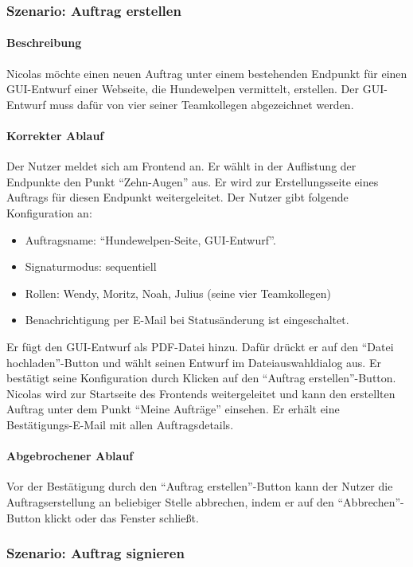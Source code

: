 \subsubsection{Szenario: Auftrag erstellen}
\paragraph{Beschreibung}
Nicolas möchte einen neuen Auftrag unter einem bestehenden Endpunkt für einen GUI-Entwurf einer Webseite, die Hundewelpen vermittelt, erstellen. Der GUI-Entwurf muss dafür von vier seiner Teamkollegen abgezeichnet werden.
\paragraph{Korrekter Ablauf}
Der Nutzer meldet sich am \gls{Frontend} an. Er wählt in der Auflistung der Endpunkte den Punkt \enquote{Zehn-Augen} aus. Er wird zur Erstellungsseite eines Auftrags für diesen Endpunkt weitergeleitet. Der Nutzer gibt folgende Konfiguration an:
\begin{itemize}
	\item Auftragsname: \enquote{Hundewelpen-Seite, GUI-Entwurf}.
	\item Signaturmodus: sequentiell
	\item Rollen: Wendy, Moritz, Noah, Julius (seine vier Teamkollegen)
	\item Benachrichtigung per E-Mail bei \gls{Status}änderung ist eingeschaltet.
\end{itemize}
\newpage
Er fügt den GUI-Entwurf als PDF-Datei hinzu. Dafür drückt er auf den \enquote{Datei hochladen}-Button und wählt seinen Entwurf im Dateiauswahldialog aus. Er bestätigt seine Konfiguration durch Klicken auf den \enquote{Auftrag erstellen}-Button. Nicolas wird zur Startseite des Frontends weitergeleitet und kann den erstellten Auftrag unter dem Punkt \enquote{Meine Aufträge} einsehen. Er erhält eine Bestätigungs-E-Mail mit allen Auftragsdetails.

\paragraph{Abgebrochener Ablauf}
Vor der Bestätigung durch den \enquote{Auftrag erstellen}-Button kann der Nutzer die Auftragserstellung an beliebiger Stelle abbrechen, indem er auf den \enquote{Abbrechen}-Button klickt oder das Fenster schließt.

\subsubsection{Szenario: Auftrag signieren}
